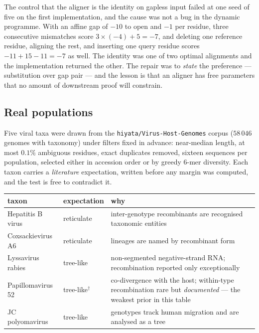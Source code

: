 \begin{remark}
The control that the aligner is the identity on gapless input failed at one seed
of five on the first implementation, and the cause was not a bug in the dynamic
programme. With an affine gap of $-10$ to open and $-1$ per residue, three
consecutive mismatches score $3\times(-4) + 5 = -7$, and deleting one reference
residue, aligning the rest, and inserting one query residue scores
$-11 + 15 - 11 = -7$ as well. The identity was one of two optimal alignments and
the implementation returned the other. The repair was to \emph{state} the
preference --- substitution over gap pair --- and the lesson is that an aligner
has free parameters that no amount of downstream proof will constrain.
\end{remark}

\subsection{Real populations}\label{sub:realdata}

Five viral taxa were drawn from the \texttt{hiyata/Virus-Host-Genomes} corpus
($58\,046$ genomes with taxonomy) under filters fixed in advance: near-median
length, at most $0.1\%$ ambiguous residues, exact duplicates removed, sixteen
sequences per population, selected either in accession order or by greedy
$6$-mer diversity. Each taxon carries a \emph{literature} expectation, written
before any margin was computed, and the test is free to contradict it.

\begin{center}\small
\begin{tabular}{@{}llp{}@{}}
\toprule
taxon & expectation & why \\
\midrule
Hepatitis B virus & reticulate & inter-genotype recombinants are recognised taxonomic entities \\
Coxsackievirus A6 & reticulate & lineages are named by recombinant form \\
Lyssavirus rabies & tree-like & non-segmented negative-strand RNA; recombination reported only exceptionally \\
Papillomavirus 52 & tree-like$^\dagger$ & co-divergence with the host; within-type recombination rare but \emph{documented} --- the weakest prior in this table \\
JC polyomavirus & tree-like & genotypes track human migration and are analysed as a tree \\
\bottomrule
\end{tabular}
\end{center}


